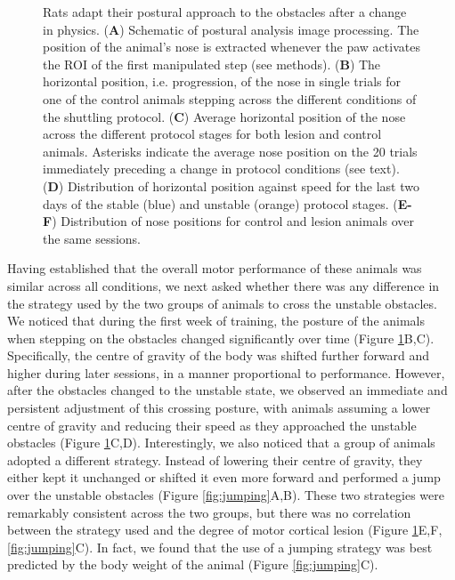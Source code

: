 \begin{figure}
\centering

\caption{Rats adapt their postural approach to the obstacles after a change in physics. (\textbf{A}) Schematic of postural analysis image processing. The position of the animal's nose is extracted whenever the paw activates the ROI of the first manipulated step (see methods). (\textbf{B}) The horizontal position, i.e. progression, of the nose in single trials for one of the control animals stepping across the different conditions of the shuttling protocol. (\textbf{C}) Average horizontal position of the nose across the different protocol stages for both lesion and control animals. Asterisks indicate the average nose position on the 20 trials immediately preceding a change in protocol conditions (see text). (\textbf{D}) Distribution of horizontal position against speed for the last two days of the stable (blue) and unstable (orange) protocol stages. (\textbf{E-F}) Distribution of nose positions for control and lesion animals over the same sessions.}
\label{fig:posture}
\end{figure}

Having established that the overall motor performance of these animals was similar across all conditions, we next asked whether there was any difference in the strategy used by the two groups of animals to cross the unstable obstacles. We noticed that during the first week of training, the posture of the animals when stepping on the obstacles changed significantly over time (Figure \ref{fig:posture}B,C). Specifically, the centre of gravity of the body was shifted further forward and higher during later sessions, in a manner proportional to performance. However, after the obstacles changed to the unstable state, we observed an immediate and persistent adjustment of this crossing posture, with animals assuming a lower centre of gravity and reducing their speed as they approached the unstable obstacles (Figure \ref{fig:posture}C,D). Interestingly, we also noticed that a group of animals adopted a different strategy. Instead of lowering their centre of gravity, they either kept it unchanged or shifted it even more forward and performed a jump over the unstable obstacles (Figure \ref{fig:jumping}A,B). These two strategies were remarkably consistent across the two groups, but there was no correlation between the strategy used and the degree of motor cortical lesion (Figure \ref{fig:posture}E,F, \ref{fig:jumping}C). In fact, we found that the use of a jumping strategy was best predicted by the body weight of the animal (Figure \ref{fig:jumping}C).

